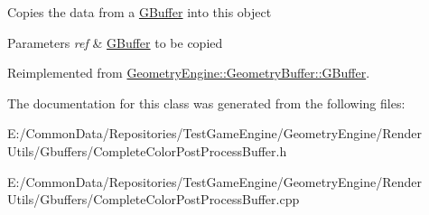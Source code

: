 Copies the data from a \mbox{\hyperlink{class_geometry_engine_1_1_geometry_buffer_1_1_g_buffer}{G\+Buffer}} into this object 
\begin{DoxyParams}{Parameters}
{\em ref} & \mbox{\hyperlink{class_geometry_engine_1_1_geometry_buffer_1_1_g_buffer}{G\+Buffer}} to be copied \\
\hline
\end{DoxyParams}


Reimplemented from \mbox{\hyperlink{class_geometry_engine_1_1_geometry_buffer_1_1_g_buffer_a9f20eb78703ef048d59a54f90ee09f25}{Geometry\+Engine\+::\+Geometry\+Buffer\+::\+G\+Buffer}}.



The documentation for this class was generated from the following files\+:\begin{DoxyCompactItemize}
\item 
E\+:/\+Common\+Data/\+Repositories/\+Test\+Game\+Engine/\+Geometry\+Engine/\+Render Utils/\+Gbuffers/Complete\+Color\+Post\+Process\+Buffer.\+h\item 
E\+:/\+Common\+Data/\+Repositories/\+Test\+Game\+Engine/\+Geometry\+Engine/\+Render Utils/\+Gbuffers/Complete\+Color\+Post\+Process\+Buffer.\+cpp\end{DoxyCompactItemize}

